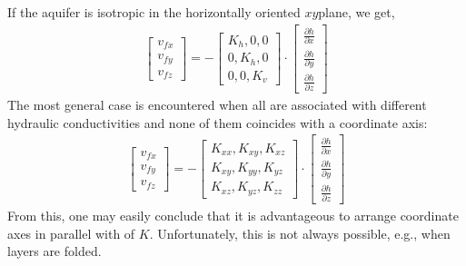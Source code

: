 \documentclass[letterpaper,10pt,english]{jupyterBook}
\begin{document}
\sphinxAtStartPar
If the aquifer is isotropic in the horizontally oriented \(xy\)\sphinxhyphen{}plane, we get,
\begin{equation*}
\begin{split}
\begin{bmatrix}
v_{fx}\\ v_{fy}\\ v_{fz}
\end{bmatrix}
= -\begin{bmatrix}
K_h, 0,  0 \\
0, K_h, 0\\
0, 0, K_v
\end{bmatrix}
\cdot
\begin{bmatrix}
\frac{\partial h}{\partial x}\\ \frac{\partial h}{\partial y} \\ \frac{\partial h}{\partial z}
\end{bmatrix}
\end{split}
\end{equation*}
\sphinxAtStartPar
The most general case is encountered when all  are associated with different hydraulic conductivities and none of them coincides with a coordinate axis:
\begin{equation*}
\begin{split}
\begin{bmatrix}
v_{fx}\\ v_{fy}\\ v_{fz}
\end{bmatrix}
= -\begin{bmatrix}
K_{xx}, K_{xy},  K_{xz} \\
K_{xy}, K_{yy}, K_{yz}\\
K_{xz}, K_{yz}, K_{zz}
\end{bmatrix}
\cdot
\begin{bmatrix}
\frac{\partial h}{\partial x}\\ \frac{\partial h}{\partial y} \\ \frac{\partial h}{\partial z}
\end{bmatrix}
\end{split}
\end{equation*}
\sphinxAtStartPar
From this, one may easily conclude that it is advantageous to arrange coordinate axes in parallel with  of \(K\). Unfortunately, this is not always possible, e.g., when layers are folded.
\end{document}

